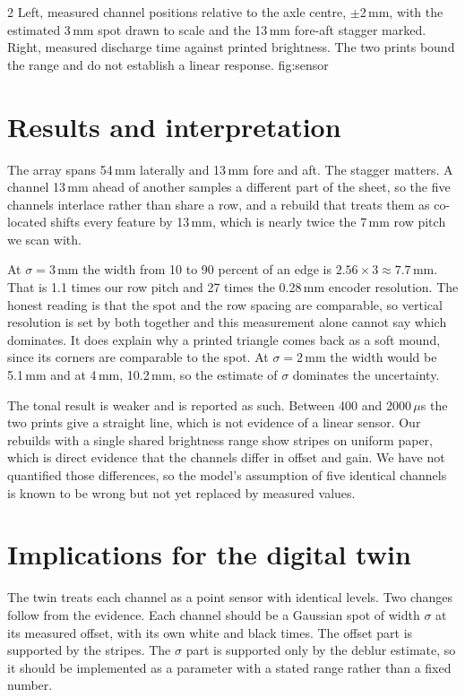 \documentclass[a4paper,10pt]{article}
\begin{document}
\begin{multicols*}{2}
{Left, measured channel positions relative to the axle centre, $\pm$2\,mm, with
the estimated 3\,mm spot drawn to scale and the 13\,mm fore-aft stagger marked.
Right, measured discharge time against printed brightness. The two prints bound
the range and do not establish a linear response.}
{fig:sensor}

\section*{Results and interpretation}
The array spans 54\,mm laterally and 13\,mm fore and aft. The stagger matters.
A channel 13\,mm ahead of another samples a different part of the sheet, so the
five channels interlace rather than share a row, and a rebuild that treats them as
co-located shifts every feature by 13\,mm, which is nearly twice the 7\,mm row
pitch we scan with.

At $\sigma=3$\,mm the width from 10 to 90 percent of an edge is
$2.56\times3\approx7.7$\,mm. That is 1.1 times our row pitch and 27 times the
0.28\,mm encoder resolution. The honest reading is that the spot and the row
spacing are comparable, so vertical resolution is set by both together and this
measurement alone cannot say which dominates. It does explain why a printed
triangle comes back as a soft mound, since its corners are comparable to the spot.
At $\sigma=2$\,mm the width would be 5.1\,mm and at 4\,mm, 10.2\,mm, so the
estimate of $\sigma$ dominates the uncertainty.

The tonal result is weaker and is reported as such. Between 400 and 2000\,$\mu$s
the two prints give a straight line, which is not evidence of a linear sensor. Our
rebuilds with a single shared brightness range show stripes on uniform paper, which
is direct evidence that the channels differ in offset and gain. We have not
quantified those differences, so the model's assumption of five identical channels
is known to be wrong but not yet replaced by measured values.

\section*{Implications for the digital twin}
The twin treats each channel as a point sensor with identical levels. Two changes
follow from the evidence. Each channel should be a Gaussian spot of width $\sigma$
at its measured offset, with its own white and black times. The offset part is
supported by the stripes. The $\sigma$ part is supported only by the deblur
estimate, so it should be implemented as a parameter with a stated range rather
than a fixed number.


\end{multicols*}
\end{document}
